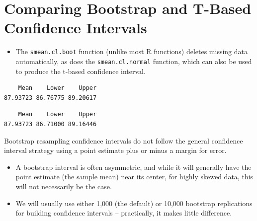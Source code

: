 \documentclass[
]{book}
\newenvironment{Shaded}{\begin{snugshade}}{\end{snugshade}}
\newcommand{\DataTypeTok}[1]{\textcolor[rgb]{0.13,0.29,0.53}{#1}}
\newcommand{\DecValTok}[1]{\textcolor[rgb]{0.00,0.00,0.81}{#1}}
\newcommand{\FloatTok}[1]{\textcolor[rgb]{0.00,0.00,0.81}{#1}}
\newcommand{\KeywordTok}[1]{\textcolor[rgb]{0.13,0.29,0.53}{\textbf{#1}}}
\newcommand{\NormalTok}[1]{#1}
\newcommand{\OperatorTok}[1]{\textcolor[rgb]{0.81,0.36,0.00}{\textbf{#1}}}
\newcommand{\StringTok}[1]{\textcolor[rgb]{0.31,0.60,0.02}{#1}}
\providecommand{\tightlist}{%
  \setlength{\itemsep}{0pt}\setlength{\parskip}{0pt}}
\begin{document}
\hypertarget{comparing-bootstrap-and-t-based-confidence-intervals}{%
\section{Comparing Bootstrap and T-Based Confidence Intervals}\label{comparing-bootstrap-and-t-based-confidence-intervals}}

\begin{itemize}
\tightlist
\item
  The \texttt{smean.cl.boot} function (unlike most R functions) deletes missing data automatically, as does the \texttt{smean.cl.normal} function, which can also be used to produce the t-based confidence interval.
\end{itemize}

\begin{Shaded}
\end{Shaded}

\begin{verbatim}
    Mean    Lower    Upper 
87.93723 86.76775 89.20617 
\end{verbatim}

\begin{Shaded}
\end{Shaded}

\begin{verbatim}
    Mean    Lower    Upper 
87.93723 86.71000 89.16446 
\end{verbatim}

Bootstrap resampling confidence intervals do not follow the general confidence interval strategy using a point estimate plus or minus a margin for error.

\begin{itemize}
\tightlist
\item
  A bootstrap interval is often asymmetric, and while it will generally have the point estimate (the sample mean) near its center, for highly skewed data, this will not necessarily be the case.
\item
  We will usually use either 1,000 (the default) or 10,000 bootstrap replications for building confidence intervals -- practically, it makes little difference.
\end{itemize}
\end{document}
